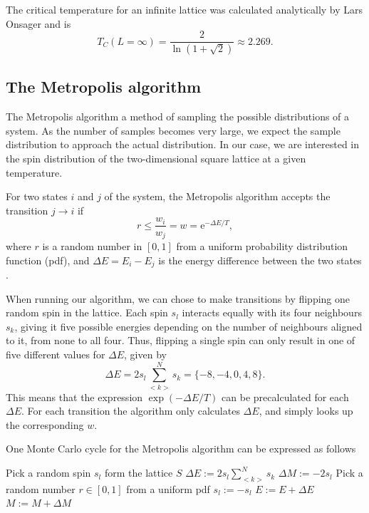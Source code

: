 \documentclass[a4paper,10pt,onecolumn]{article}
\newcommand{\e}[1]{\mathrm{e}^{#1}}	%
\begin{document}
The critical temperature for an infinite lattice was calculated analytically by Lars Onsager and is \cite{labtext}
\begin{equation}\label{eq:exact}
T_C(L=\infty) = \frac{2}{\ln(1+\sqrt{2})} \approx 2.269. 
\end{equation}

\subsection{The Metropolis algorithm}
The Metropolis algorithm a method of sampling the possible distributions of a system. As the number of samples becomes very large, we expect the sample distribution to approach the actual distribution. 
In our case, we are interested in the spin distribution of the two-dimensional square lattice at a given temperature.   
 
For two states $i$ and $j$ of the system, the Metropolis algorithm accepts the transition $j\to i$ if 
\[
r \leq \frac{w_i}{w_j} = w = \e{-\Delta E/T},
\]
where $r$ is a random number in $[0,1]$ from a uniform probability distribution function (pdf), and $\Delta E = E_i-E_j$ is the energy difference between the two states \cite{lecture}. 

When running our algorithm, we can chose to make transitions by flipping one random spin in the lattice. Each spin $s_l$ interacts equally with its four neighbours $s_k$, giving it five possible energies depending on the number of neighbours aligned to it, from none to all four. 
Thus, flipping a single spin can only result in one of five different values for $\Delta E$, given by
\begin{equation}
\Delta E = 2s_l\sum_{<k>}^Ns_k = \{-8,-4,0,4,8\}.
\end{equation} 
This means that the expression $\exp(-\Delta E/T)$ can be precalculated for each $\Delta E$. For each transition the algorithm only calculates $\Delta E$, and simply looks up the corresponding $w$.      

One Monte Carlo cycle for the Metropolis algorithm can be expressed as follows
\begin{algorithmic}
\State Pick a random spin $s_l$ form the lattice $S$
\State $\Delta E := 2s_l\sum_{<k>}^N s_k$
\State $\Delta M := -2s_l$
\State Pick a random number $r \in [0,1]$ from a uniform pdf
\State $s_l := -s_l$
\State $E := E+\Delta E$
\State $M := M+\Delta M$
\EndIf
\EndFor
\end{algorithmic}
\end{document}
